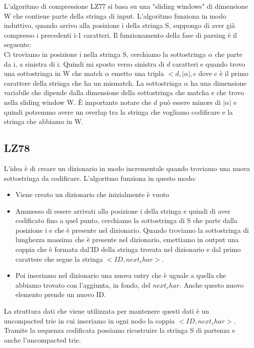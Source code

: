 \documentclass[12pt]{article}
\begin{document}
L'algoritmo di compressione LZ77 si basa su una "sliding windows" di dimensione W che contiene parte della stringa di input. L'algoritmo funziona in modo induttivo, quando arrivo alla posizione i della stringa S, suppongo di aver già compresso i precedenti i-1 caratteri.
Il funzionamento della fase di parsing è il seguente: \\
Ci troviamo in posizione i nella stringa S, cerchiamo la sottostringa $\alpha$ che parte da i, a sinistra di i. 
Quindi mi sposto verso sinistra di $d$ caratteri e quando trovo una sottostringa in W che match $\alpha$ emetto una tripla $<d, |\alpha|, c$ dove c è il primo carattere della stringa che ha un mismatch.
La sottostringa $\alpha$ ha una dimensione variabile che dipende dalla dimensione della sottostringa che matcha e che trovo nella sliding window W.
È importante notare che $d$ può essere minore di $|\alpha|$ e quindi potremmo avere un overlap tra la stringa che vogliamo codificare e la stringa che abbiamo in W.

\subsection{LZ78}


L'idea è di creare un dizionario in modo incrementale quando troviamo una nuova sottostringa da codificare.
L'algoritmo funziona in questo modo:
\begin{itemize}
\item Viene creato un dizionario che inizialmente è vuoto
\item Ammesso di essere arrivati alla posizione i della stringa e quindi di aver codificato fino a quel punto, cerchiamo la sottostringa di S che parte dalla posizione i e che è presente nel dizionario. Quando troviamo la sottostringa di lunghezza massima che è presente nel dizionario, emettiamo in output una coppia che è formata dal'ID della stringa trovata nel dizionario e dal primo carattere che segue la stringa $<ID, next_char>$. 
\item Poi inseriamo nel dizionario una nuova entry che è uguale a quella che abbiamo trovato con l'aggiunta, in fondo, del $next_char$. Anche questo nuovo elemento prende un nuovo ID.
\end{itemize}

La struttura dati che viene utilizzata per mantenere questi dati è un uncompacted trie in cui inseriamo in ogni nodo la coppia $<ID, next_char>$. 
Tramite la sequenza codificata possiamo ricostruire la stringa S di partenza e anche l'uncompacted trie.
\end{document}

